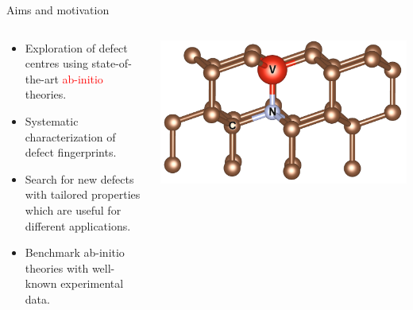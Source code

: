 \begin{frame}{Aims and motivation} %

  \begin{columns}
    \begin{column}{0.5\textwidth}
      \begin{itemize}

        \item
          Exploration of defect centres using state-of-the-art \textcolor{red}{ab-initio}
          theories.

        \item
          Systematic characterization of defect fingerprints.

        \item
          Search for new defects with tailored properties which are useful
          for different applications.

        \item
          Benchmark ab-initio theories with well-known
          experimental data.


      \end{itemize}
    \end{column}
    \begin{column}{0.5\textwidth}
      \begin{center}
        \includegraphics[width=1\textwidth]{images/POSCAR_16_view.png}
      \end{center}
    \end{column}
  \end{columns}


\end{frame}
